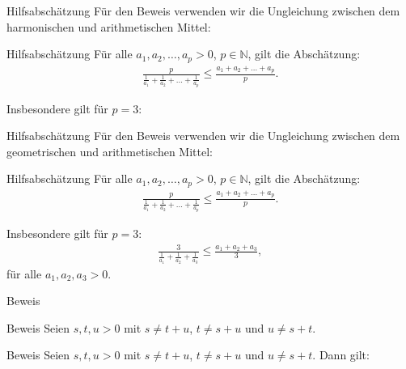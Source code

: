 \documentclass[10pt]{beamer}
\def\bN{\mathbb{N}}
\begin{document}
\begin{frame}{Hilfsabschätzung}
    Für den Beweis verwenden wir die Ungleichung zwischen dem harmonischen und arithmetischen Mittel:
    \begin{block}{Hilfsabschätzung}
        Für alle \( a_{1}, a_{2}, \ldots, a_{p} > 0 \), \( p \in \bN \), gilt die Abschätzung:
        \begin{align*}
            \frac{p}{\frac{1}{a_{1}} + \frac{1}{a_{2}} + \ldots + \frac{1}{a_{p}}}
            \leq \frac{a_{1} + a_{2} + \ldots + a_{p}}{p}.
        \end{align*}
    \end{block}
    Insbesondere gilt für \( p = 3 \):   
\end{frame}



\begin{frame}{Hilfsabschätzung}
    Für den Beweis verwenden wir die Ungleichung zwischen dem geometrischen und arithmetischen Mittel:
    \begin{block}{Hilfsabschätzung}
        Für alle \( a_{1}, a_{2}, \ldots, a_{p} > 0 \), \( p \in \bN \), gilt die Abschätzung:
        \begin{align*}
            \frac{p}{\frac{1}{a_{1}} + \frac{1}{a_{2}} + \ldots + \frac{1}{a_{p}}}
            \leq \frac{a_{1} + a_{2} + \ldots + a_{p}}{p}.
        \end{align*}
    \end{block}
    Insbesondere gilt für \( p = 3 \): 
    \begin{align*}
        \frac{3}{\frac{1}{a_{1}} + \frac{1}{a_{2}} + \frac{1}{a_{3}}}
        \leq \frac{a_{1} + a_{2} + a_{3}}{3},
    \end{align*}
    für alle \( a_{1}, a_{2}, a_{3} > 0 \).
\end{frame}



\begin{frame}{Beweis}
    
\end{frame}


\begin{frame}{Beweis}
    Seien \( s, t, u > 0 \) mit \( s \neq t + u \), \( t \neq s+ u \) und \( u \neq s + t \).
\end{frame}



\begin{frame}{Beweis}
    Seien \( s, t, u > 0 \) mit \( s \neq t + u \), \( t \neq s+ u \) und \( u \neq s + t \). Dann gilt:
\end{frame}
\end{document}
